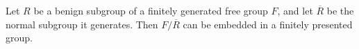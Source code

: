 Let $R$ be a benign subgroup of a finitely generated free group $F$, and let $\overline{R}$ be the normal subgroup it generates. Then $F / \overline{R}$ can be embedded in a finitely presented group.
